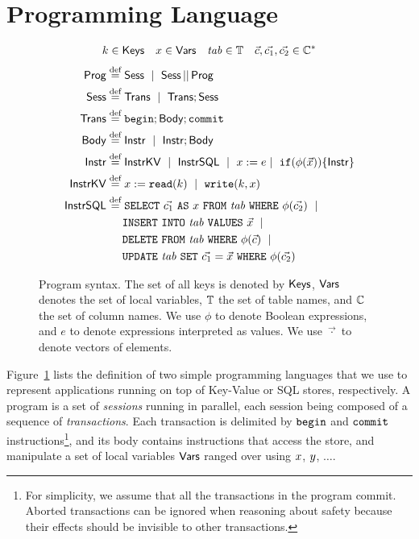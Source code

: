 
\section{Programming Language}\label{sec:app:prog_lang}

\begin{figure}
\small
\begin{align*}
k\in \mathsf{Keys}\quad {x}\in\mathsf{Vars}\quad \mathit{tab}\in\mathbb{T}\quad \vec{c},\vec{c_1},\vec{c_2}\in \mathbb{C}^*
\end{align*}
\begin{align*}
\mathsf{Prog} &  \stackrel{\text{def}}{=}  \mathsf{Sess} \ \mid\  \mathsf{Sess}\,||\,\mathsf{Prog} \\
\mathsf{Sess} & \stackrel{\text{def}}{=}  \mathsf{Trans} \ \mid\  \mathsf{Trans}; \mathsf{Sess} \\
\mathsf{Trans} & \stackrel{\text{def}}{=}  \mathtt{begin}; \mathsf{Body}; \mathtt{commit} \\
\mathsf{Body} & \stackrel{\text{def}}{=}  \mathsf{Instr} \ \mid\  \mathsf{Instr}; \mathsf{Body} \\
\mathsf{Instr} & \stackrel{\text{def}}{=}  \mathsf{InstrKV} \ \mid\  \mathsf{InstrSQL}\ \mid\  x := e \mid\ \mathtt{if}({\phi(\vec{x})}) \{ {\mathsf{Instr}} \} \\
\mathsf{InstrKV} & \stackrel{\text{def}}{=} {x} := \mathtt{read}(k)  \ \mid\  \mathtt{write}(k,{x}) \\
\mathsf{InstrSQL} & \stackrel{\text{def}}{=}  \mathtt{SELECT}\ {\vec{c_1}}\ \mathtt{AS}\ {{x}}\ \mathtt{FROM}\ {\mathit{tab}}\ \mathtt{WHERE}\ {\phi(\vec{c_2})} \ \mid\ \\
& \hspace{5mm} \mathtt{INSERT\ INTO}\ {\mathit{tab}}\ \mathtt{VALUES}\ {\vec{x}} \ \mid\ \\
& \hspace{5mm} \mathtt{DELETE\ FROM}\ {\mathit{tab}}\ \mathtt{WHERE}\ {\phi(\vec{c})} \ \mid\ \\
& \hspace{5mm} \mathtt{UPDATE}\ {\mathit{tab}}\ \mathtt{SET}\ {\vec{c_1}=\vec{x}}\ \mathtt{WHERE}\ {\phi(\vec{c_2})} 
\end{align*}
\vspace{-6mm}
\caption{Program syntax. The set of all keys is denoted by $\mathsf{Keys}$, $\mathsf{Vars}$ denotes the set of local variables, $\mathbb{T}$ the set of table names, and $\mathbb{C}$ the set of column names.
We use $\phi$ to denote Boolean expressions, and $e$ to denote expressions interpreted as values. We use $\vec{\cdot}$ to denote vectors of elements.}
\label{fig:syntax}
\vspace{-4mm}
\end{figure}

Figure~\ref{fig:syntax} lists the definition of two simple programming languages that we use to represent applications running on top of Key-Value or SQL stores, respectively. A program is a set of \emph{sessions} running in parallel, each session being composed of a sequence of \emph{transactions}. Each transaction is delimited by $\mathtt{begin}$ and $\mathtt{commit}$ instructions\footnote{For simplicity, we assume that all the transactions in the program commit. Aborted transactions can be ignored when reasoning about safety because their effects should be invisible to other transactions.}, and its body contains instructions that access the store, and manipulate a set of local variables $\mathsf{Vars}$ ranged over using ${x}$, ${y}$, $\ldots$.

